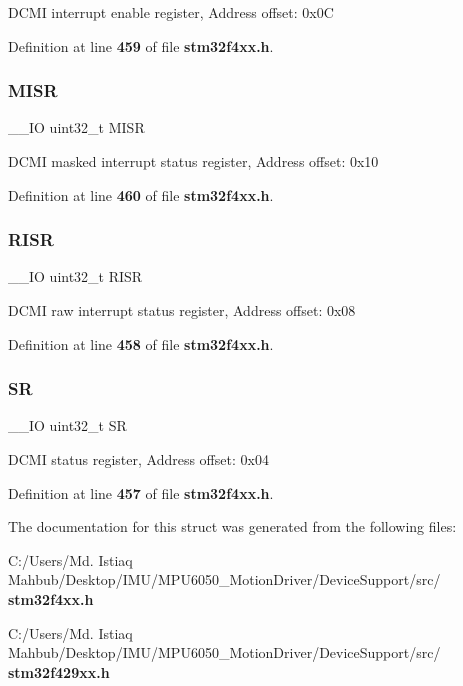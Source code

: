 D\+C\+MI interrupt enable register, Address offset\+: 0x0C 

Definition at line \textbf{ 459} of file \textbf{ stm32f4xx.\+h}.

\mbox{\label{structDCMI__TypeDef_a524e134cec519206cb41d0545e382978}} 
\subsubsection{M\+I\+SR}
{\footnotesize\ttfamily \+\_\+\+\_\+\+IO uint32\+\_\+t M\+I\+SR}

D\+C\+MI masked interrupt status register, Address offset\+: 0x10 

Definition at line \textbf{ 460} of file \textbf{ stm32f4xx.\+h}.

\mbox{\label{structDCMI__TypeDef_aa196fddf0ba7d6e3ce29bdb04eb38b94}} 
\subsubsection{R\+I\+SR}
{\footnotesize\ttfamily \+\_\+\+\_\+\+IO uint32\+\_\+t R\+I\+SR}

D\+C\+MI raw interrupt status register, Address offset\+: 0x08 

Definition at line \textbf{ 458} of file \textbf{ stm32f4xx.\+h}.

\mbox{\label{structDCMI__TypeDef_af6aca2bbd40c0fb6df7c3aebe224a360}} 
\subsubsection{SR}
{\footnotesize\ttfamily \+\_\+\+\_\+\+IO uint32\+\_\+t SR}

D\+C\+MI status register, Address offset\+: 0x04 

Definition at line \textbf{ 457} of file \textbf{ stm32f4xx.\+h}.



The documentation for this struct was generated from the following files\+:\begin{DoxyCompactItemize}
\item 
C\+:/\+Users/\+Md. Istiaq Mahbub/\+Desktop/\+I\+M\+U/\+M\+P\+U6050\+\_\+\+Motion\+Driver/\+Device\+Support/src/\textbf{ stm32f4xx.\+h}\item 
C\+:/\+Users/\+Md. Istiaq Mahbub/\+Desktop/\+I\+M\+U/\+M\+P\+U6050\+\_\+\+Motion\+Driver/\+Device\+Support/src/\textbf{ stm32f429xx.\+h}\end{DoxyCompactItemize}
